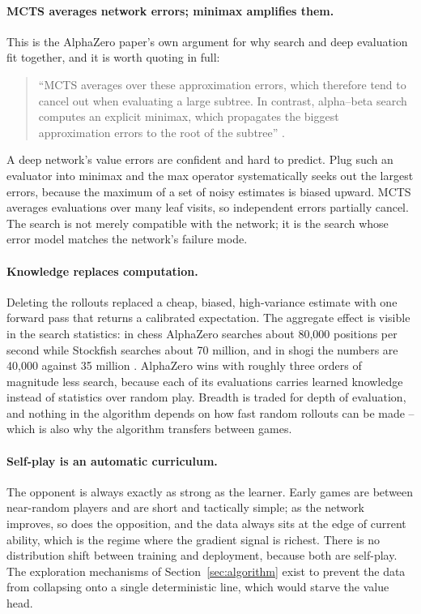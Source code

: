 \paragraph{MCTS averages network errors; minimax amplifies them.} This is the
AlphaZero paper's own argument for why search and deep evaluation fit together,
and it is worth quoting in full:

\begin{quote}
``MCTS averages over these approximation errors, which therefore tend to cancel
out when evaluating a large subtree. In contrast, alpha--beta search computes an
explicit minimax, which propagates the biggest approximation errors to the root
of the subtree'' \citep{silver2018alphazero}.
\end{quote}

A deep network's value errors are confident and hard to predict. Plug such an
evaluator into minimax and the max operator systematically seeks out the largest
errors, because the maximum of a set of noisy estimates is biased upward. MCTS
averages evaluations over many leaf visits, so independent errors partially
cancel. The search is not merely compatible with the network; it is the search
whose error model matches the network's failure mode.

\paragraph{Knowledge replaces computation.} Deleting the rollouts replaced a
cheap, biased, high-variance estimate with one forward pass that returns a
calibrated expectation. The aggregate effect is visible in the search statistics:
in chess AlphaZero searches about 80{,}000 positions per second while Stockfish
searches about 70 million, and in shogi the numbers are 40{,}000 against 35
million \citep{silver2018alphazero}. AlphaZero wins with roughly three orders of
magnitude less search, because each of its evaluations carries learned knowledge
instead of statistics over random play. Breadth is traded for depth of
evaluation, and nothing in the algorithm depends on how fast random rollouts can
be made -- which is also why the algorithm transfers between games.

\paragraph{Self-play is an automatic curriculum.} The opponent is always exactly
as strong as the learner. Early games are between near-random players and are
short and tactically simple; as the network improves, so does the opposition, and
the data always sits at the edge of current ability, which is the regime where
the gradient signal is richest. There is no distribution shift between training
and deployment, because both are self-play. The exploration mechanisms of
Section~\ref{sec:algorithm} exist to prevent the data from collapsing onto a
single deterministic line, which would starve the value head.


